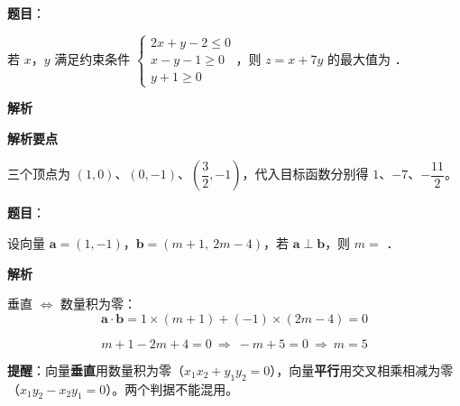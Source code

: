 \begin{answer}

\textbf{题目}：

若 $x$，$y$ 满足约束条件 $\begin{cases}2x+y-2\le0\\ x-y-1\ge0\\ y+1\ge0\end{cases}$，则 $z=x+7y$ 的最大值为 \gkblank{}．

\textbf{解析}

\textbf{解析要点}

三个顶点为 $(1,0)$、$(0,-1)$、$\left(\dfrac32,-1\right)$，代入目标函数分别得 $1$、$-7$、$-\dfrac{11}2$。


\par\medskip

\end{answer}
\begin{answer}

\textbf{题目}：

设向量 $\boldsymbol a=(1,-1)$，$\boldsymbol b=(m+1,\ 2m-4)$，若 $\boldsymbol a\perp\boldsymbol b$，则 $m=$ \gkblank{}．

\textbf{解析}

垂直 $\iff$ 数量积为零：
\nopagebreak[4]
\[\boldsymbol a\cdot\boldsymbol b=1\times(m+1)+(-1)\times(2m-4)=0\]

\nopagebreak[4]
\[m+1-2m+4=0\ \Longrightarrow\ -m+5=0\ \Longrightarrow\ m=5\]

\begin{gktip}
\textbf{提醒}：向量\textbf{垂直}用数量积为零（$x_1x_2+y_1y_2=0$），向量\textbf{平行}用交叉相乘相减为零（$x_1y_2-x_2y_1=0$）。两个判据不能混用。
\end{gktip}


\par\medskip

\end{answer}
